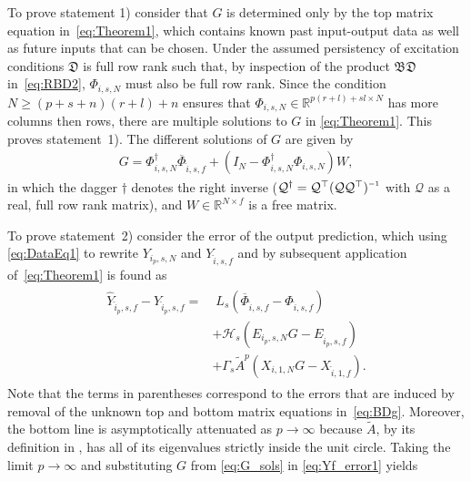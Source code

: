 To prove statement 1) consider that $G$ is determined only by the top matrix equation in~\eqref{eq:Theorem1}, which contains known past input-output data as well as future inputs that can be chosen. Under the assumed persistency of excitation conditions $\mathfrak{D}$ is full row rank such that, by inspection of the product $\mathfrak{BD}$ in~\eqref{eq:RBD2}, $\Phi_{i,s,N}$ must also be full row rank. %
Since the condition ${N\geq(p+s+n)(r+l)+n}$ ensures that $\Phi_{i,s,N}\in\mathbb{R}^{p(r+l)+sl\times N}$ has more columns then rows, there are multiple solutions to $G$ in \eqref{eq:Theorem1}. This proves statement~1). The different solutions of $G$ are given by
\begin{align}%
    G = \Phi_{i,s,N}^\dagger\overline{\Phi}_{\hat{i},s,f} + (I_N-\Phi_{i,s,N}^\dagger\Phi_{i,s,N})W,
\end{align}
in which the dagger $\dagger$ denotes the right inverse ($\mathcal{Q}^\dagger=\mathcal{Q}^\top(\mathcal{Q}\mathcal{Q}^\top)\inv$ with $\mathcal{Q}$ as a real, full row rank matrix), and $W\in\mathbb{R}^{N\times f}$ is a free matrix.
%

To prove statement~2) consider the error of the output prediction, which using \eqref{eq:DataEq1} to rewrite $Y_{i_p,s,N}$ and $Y_{\hat{i},s,f}$ and by subsequent application of~\eqref{eq:Theorem1} is found as
\begin{align}%
    \begin{split}
        \widehat{Y}_{\hat{i}_p,s,f}-Y_{\hat{i}_p,s,f} = &\; L_s(\overline{\Phi}_{\hat{i},s,f}-\Phi_{\hat{i},s,f})\\
        &+\mathcal{H}_s (E_{i_p,s,N}G-E_{\hat{i}_p,s,f})\\
        &+ \Gamma_s \tilde{A}^p (X_{i,1,N}G-X_{\hat{i},1,f}).
    \end{split}
\end{align}
Note that the terms in parentheses correspond to the errors that are induced by removal of the unknown top and bottom matrix equations in~\eqref{eq:BDg}. Moreover, the bottom line is asymptotically attenuated as $p\rightarrow\infty$ because $\tilde{A}$, by its definition in , has all of its eigenvalues strictly inside the unit circle. Taking the limit $p\rightarrow\infty$ and substituting $G$ from \eqref{eq:G_sols} in \eqref{eq:Yf_error1} yields

